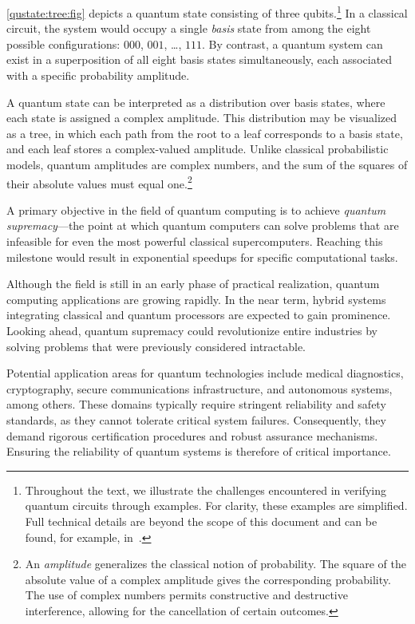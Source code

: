 \cref{qustate:tree:fig} depicts a quantum state consisting of three qubits.\footnote{Throughout the text, we illustrate the challenges encountered in verifying quantum circuits through examples. %
For clarity, these examples are simplified. Full technical details are beyond the scope of this document and can be found, for example, in~\citep{10.5555/1408782}.} In a classical circuit, the system would occupy a single \emph{basis} state from among the eight possible configurations: $000$, $001$, \ldots, $111$. %
By contrast, a quantum system can exist in a superposition of all eight basis states simultaneously, each associated with a specific probability amplitude.

A quantum state can be interpreted as a distribution over basis states, where each state is assigned a complex amplitude. This distribution may be visualized as a tree, in which each path from the root to a leaf corresponds to a basis state, and each leaf stores a complex-valued amplitude. %
Unlike classical probabilistic models, quantum amplitudes are complex numbers, and the sum of the squares of their absolute values must equal one.\footnote{An \emph{amplitude} generalizes the classical notion of probability. The square of the absolute value of a complex amplitude gives the corresponding probability. The use of complex numbers permits constructive and destructive interference, allowing for the cancellation of certain outcomes.} %

A primary objective in the field of quantum computing is to achieve \emph{quantum supremacy}---the point at which quantum computers can solve problems that are infeasible for even the most powerful classical supercomputers. %
Reaching this milestone would result in exponential speedups for specific computational tasks. %

Although the field is still in an early phase of practical realization, quantum computing applications are growing rapidly. %
In the near term, hybrid systems integrating classical and quantum processors are expected to gain prominence. Looking ahead, quantum supremacy could revolutionize entire industries by solving problems that were previously considered intractable. %

Potential application areas for quantum technologies include medical diagnostics, cryptography, secure communications infrastructure, and autonomous systems, among others. %
These domains typically require stringent reliability and safety standards, as they cannot tolerate critical system failures. Consequently, they demand rigorous certification procedures and robust assurance mechanisms. Ensuring the reliability of quantum systems is therefore of critical importance. %

